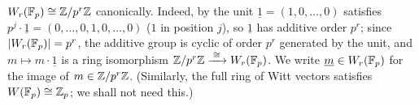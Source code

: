 \begin{example}\label{example:witt_of_Fp}
$W_r(\mathbb{F}_p) \cong \mathbb{Z}/p^r\mathbb{Z}$ canonically. Indeed, by
 the unit $\underline 1 = (1, 0, \dots, 0)$ satisfies
$p^j \cdot \underline 1 = (0, \dots, 0, 1, 0, \dots, 0)$ ($1$ in position $j$), so
$\underline 1$ has additive order $p^r$; since $|W_r(\mathbb{F}_p)| = p^r$, the additive group
is cyclic of order $p^r$ generated by the unit, and $m \mapsto m \cdot \underline 1$
is a ring isomorphism $\mathbb{Z}/p^r\mathbb{Z} \xrightarrow{\;\cong\;} W_r(\mathbb{F}_p)$. We write
$\underline m \in W_r(\mathbb{F}_p)$ for the image of $m \in \mathbb{Z}/p^r\mathbb{Z}$. (Similarly, the full
ring of Witt vectors satisfies $W(\mathbb{F}_p) \cong \mathbb{Z}_p$; we shall not need this.)
\end{example}




